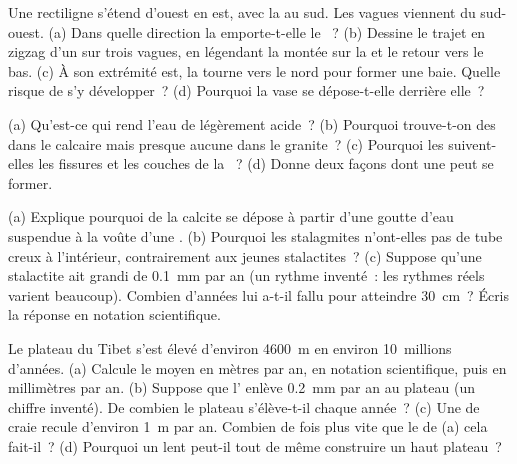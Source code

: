 \begin{exercise}[$\star\star$]\label{exo:g9:landforms:7}
Une  rectiligne s'étend d'ouest en est, avec la  au sud. Les vagues
viennent du sud-ouest. (a) Dans quelle direction la 
emporte-t-elle le ~? (b) Dessine le trajet en zigzag d'un  sur
trois vagues, en légendant la montée sur la  et le retour vers le
bas. (c) À son extrémité est, la  tourne vers le nord pour former une
baie. Quelle  risque de s'y développer~? (d) Pourquoi la
vase se dépose-t-elle derrière elle~?
\end{exercise}

\begin{exercise}[$\star\star$]\label{exo:g9:landforms:8}
(a) Qu'est-ce qui rend l'eau de  légèrement acide~? (b) Pourquoi
trouve-t-on des  dans le calcaire mais presque aucune dans le
granite~? (c) Pourquoi les  suivent-elles les fissures et les
couches de la ~? (d) Donne deux façons dont une  peut se
former.
\end{exercise}

\begin{exercise}[$\star\star$]\label{exo:g9:landforms:9}
(a) Explique pourquoi de la calcite se dépose à partir d'une goutte d'eau
suspendue à la voûte d'une . (b) Pourquoi les stalagmites n'ont-elles
pas de tube creux à l'intérieur, contrairement aux jeunes stalactites~?
(c) Suppose qu'une stalactite ait grandi de \qty{0.1}{mm} par an (un
rythme inventé~: les rythmes réels varient beaucoup). Combien d'années
lui a-t-il fallu pour atteindre \qty{30}{cm}~? Écris la réponse en
notation scientifique.
\end{exercise}

\begin{exercise}[$\star\star$]\label{exo:g9:landforms:10}
Le plateau du Tibet s'est élevé d'environ \qty{4600}{m} en environ
10~millions d'années. (a) Calcule le  moyen en mètres par an,
en notation scientifique, puis en millimètres par an. (b) Suppose que
l' enlève \qty{0.2}{mm} par an au plateau (un chiffre inventé). De
combien le plateau s'élève-t-il chaque année~? (c) Une  de craie
recule d'environ \qty{1}{m} par an. Combien de fois plus vite que le
 de (a) cela fait-il~? (d) Pourquoi un  lent
peut-il tout de même construire un haut plateau~?
\end{exercise}


